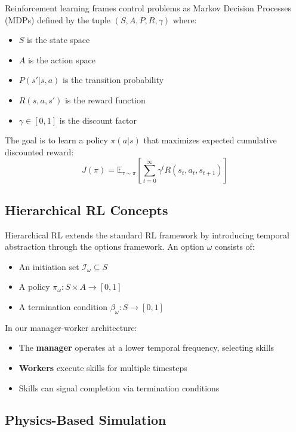 \documentclass[11pt]{article}
\begin{document}
Reinforcement learning frames control problems as Markov Decision Processes (MDPs) defined by the tuple $(S, A, P, R, \gamma)$ where:
\begin{itemize}
    \item $S$ is the state space
    \item $A$ is the action space
    \item $P(s'|s,a)$ is the transition probability
    \item $R(s,a,s')$ is the reward function
    \item $\gamma \in [0,1]$ is the discount factor
\end{itemize}

The goal is to learn a policy $\pi(a|s)$ that maximizes expected cumulative discounted reward:
\begin{equation}
    J(\pi) = \mathbb{E}_{\tau \sim \pi} \left[ \sum_{t=0}^{\infty} \gamma^t R(s_t, a_t, s_{t+1}) \right]
\end{equation}

\subsection{Hierarchical RL Concepts}

Hierarchical RL extends the standard RL framework by introducing temporal abstraction through the options framework. An option $\omega$ consists of:
\begin{itemize}
    \item An initiation set $\mathcal{I}_\omega \subseteq S$
    \item A policy $\pi_\omega: S \times A \rightarrow [0,1]$
    \item A termination condition $\beta_\omega: S \rightarrow [0,1]$
\end{itemize}

In our manager-worker architecture:
\begin{itemize}
    \item The \textbf{manager} operates at a lower temporal frequency, selecting skills
    \item \textbf{Workers} execute skills for multiple timesteps
    \item Skills can signal completion via termination conditions
\end{itemize}

\subsection{Physics-Based Simulation}
\end{document}
